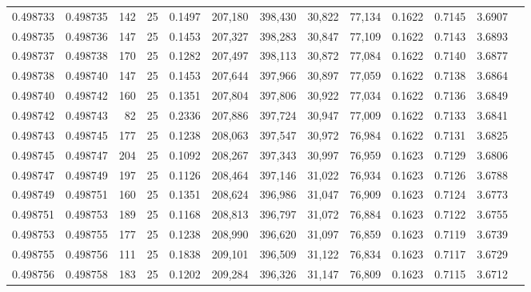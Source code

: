 \begin{tabular}{rrrrrrrrrrrrr}
0.498733 & 0.498735 & 142 &  25 &                                     0.1497 & 207,180 & 398,430 &  30,822 &  77,134 & 0.1622 & 0.7145 & 3.6907 \\
0.498735 & 0.498736 & 147 &  25 &                                     0.1453 & 207,327 & 398,283 &  30,847 &  77,109 & 0.1622 & 0.7143 & 3.6893 \\
0.498737 & 0.498738 & 170 &  25 &                                     0.1282 & 207,497 & 398,113 &  30,872 &  77,084 & 0.1622 & 0.7140 & 3.6877 \\
0.498738 & 0.498740 & 147 &  25 &                                     0.1453 & 207,644 & 397,966 &  30,897 &  77,059 & 0.1622 & 0.7138 & 3.6864 \\
0.498740 & 0.498742 & 160 &  25 &                                     0.1351 & 207,804 & 397,806 &  30,922 &  77,034 & 0.1622 & 0.7136 & 3.6849 \\
0.498742 & 0.498743 &  82 &  25 &                                     0.2336 & 207,886 & 397,724 &  30,947 &  77,009 & 0.1622 & 0.7133 & 3.6841 \\
0.498743 & 0.498745 & 177 &  25 &                                     0.1238 & 208,063 & 397,547 &  30,972 &  76,984 & 0.1622 & 0.7131 & 3.6825 \\
0.498745 & 0.498747 & 204 &  25 &                                     0.1092 & 208,267 & 397,343 &  30,997 &  76,959 & 0.1623 & 0.7129 & 3.6806 \\
0.498747 & 0.498749 & 197 &  25 &                                     0.1126 & 208,464 & 397,146 &  31,022 &  76,934 & 0.1623 & 0.7126 & 3.6788 \\
0.498749 & 0.498751 & 160 &  25 &                                     0.1351 & 208,624 & 396,986 &  31,047 &  76,909 & 0.1623 & 0.7124 & 3.6773 \\
0.498751 & 0.498753 & 189 &  25 &                                     0.1168 & 208,813 & 396,797 &  31,072 &  76,884 & 0.1623 & 0.7122 & 3.6755 \\
0.498753 & 0.498755 & 177 &  25 &                                     0.1238 & 208,990 & 396,620 &  31,097 &  76,859 & 0.1623 & 0.7119 & 3.6739 \\
0.498755 & 0.498756 & 111 &  25 &                                     0.1838 & 209,101 & 396,509 &  31,122 &  76,834 & 0.1623 & 0.7117 & 3.6729 \\
0.498756 & 0.498758 & 183 &  25 &                                     0.1202 & 209,284 & 396,326 &  31,147 &  76,809 & 0.1623 & 0.7115 & 3.6712 \\

\end{tabular}
